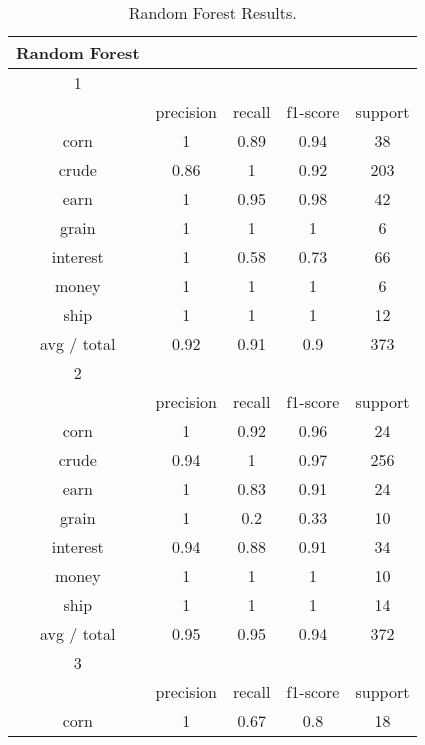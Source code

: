 \documentclass[11pt]{article}
\begin{document}
\begin{center}
\begin{longtable}{| c | c | c | c | c |}
\caption{Random Forest Results.} \\
\hline
Random Forest &           &        &          &         \\
\hline
1            &           &        &          &         \\
\hline
             & precision & recall & f1-score & support \\
 corn          & 1         & 0.89   & 0.94     & 38      \\
crude         & 0.86      & 1      & 0.92     & 203     \\
earn          & 1         & 0.95   & 0.98     & 42      \\
grain         & 1         & 1      & 1        & 6       \\
interest      & 1         & 0.58   & 0.73     & 66      \\
money         & 1         & 1      & 1        & 6       \\
ship          & 1         & 1      & 1        & 12      \\
 avg / total   & 0.92      & 0.91   & 0.9      & 373     \\
 \hline
2            &           &        &          &         \\
\hline
             & precision & recall & f1-score & support \\
 corn          & 1         & 0.92   & 0.96     & 24      \\
crude         & 0.94      & 1      & 0.97     & 256     \\
earn          & 1         & 0.83   & 0.91     & 24      \\
grain         & 1         & 0.2    & 0.33     & 10      \\
interest      & 0.94      & 0.88   & 0.91     & 34      \\
money         & 1         & 1      & 1        & 10      \\
ship          & 1         & 1      & 1        & 14      \\
 avg / total   & 0.95      & 0.95   & 0.94     & 372     \\
 \hline
3            &           &        &          &         \\
\hline
             & precision & recall & f1-score & support \\
 corn          & 1         & 0.67   & 0.8      & 18      \\

\end{longtable}
\end{center}
\end{document}
